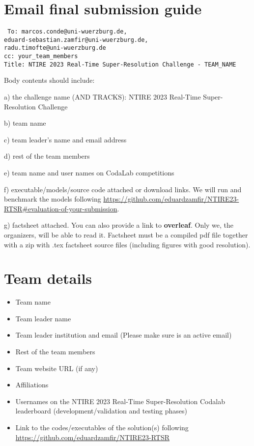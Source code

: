 \documentclass{article}
\begin{document}
\section*{Email final submission guide}

\texttt{
To: marcos.conde@uni-wuerzburg.de, \\
eduard-sebastian.zamfir@uni-wuerzburg.de, \\
radu.timofte@uni-wuerzburg.de\\
cc: your\_team\_members\\
Title: NTIRE 2023 Real-Time Super-Resolution Challenge - TEAM\_NAME\\
}

Body contents should include: 

a) the challenge name (AND TRACKS): NTIRE 2023 Real-Time Super-Resolution Challenge

b) team name 

c) team leader's name and email address 

d) rest of the team members 

e) team name and user names on CodaLab competitions 

f) executable/models/source code attached or download links. We will run and benchmark the models following \url{https://github.com/eduardzamfir/NTIRE23-RTSR#evaluation-of-your-submission}.

g) factsheet attached. You can also provide a link to \textbf{overleaf}. Only we, the organizers, will be able to read it. Factsheet must be a compiled pdf file together with a zip with .tex factsheet source files (including figures with good resolution). 

\section{Team details}

\begin{itemize}
\item Team name                                  
\item Team leader name                           
\item Team leader institution and email (Please make sure is an active email)
\item Rest of the team members        
\item Team website URL (if any)                   
\item Affiliations
\item Usernames on the NTIRE 2023 Real-Time Super-Resolution Codalab leaderboard (development/validation and testing phases)
\item Link to the codes/executables of the solution(s) following \url{https://github.com/eduardzamfir/NTIRE23-RTSR}
\end{itemize}
\end{document}
